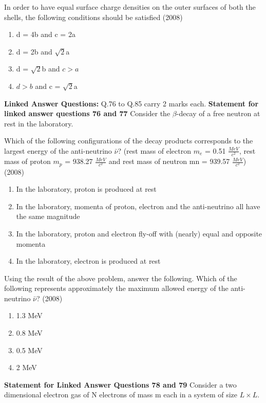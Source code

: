     \item In order to have equal surface charge densities on the outer surfaces of both the shells, the following conditions should be satisfied \hfill (2008)
     \begin{enumerate}[label=(\Alph*)]
        \item d = 4b and c = 2a
        \item d = 2b and $\sqrt{2}$a
        \item d = $\sqrt{2}$b and $c>a$
        \item $d>b$ and c = $\sqrt{2}$a 
     \end{enumerate}
    \textbf{Linked Answer Questions:} Q.76 to Q.85 carry 2 marks each.
    \textbf{Statement for linked answer questions 76 and 77}
    Consider the $\beta$-decay of a free neutron at rest in the laboratory.
    \item Which of the following configurations of the decay products corresponds to the largest energy of the anti-neutrino $\bar{\nu}$? (rest mass of electron $m_e$ = 0.51 $\frac{MeV}{c^2}$, rest mass of proton $m_p$ = 938.27 $\frac{MeV}{c^2}$ and rest mass of neutron mn = 939.57 $\frac{MeV}{c^2}$) \hfill (2008)
      \begin{enumerate}[label=(\Alph*)]
        \item In the laboratory, proton is produced at rest
        \item In the laboratory, momenta of proton, electron and the anti-neutrino all have the same magnitude
        \item In the laboratory, proton and electron fly-off with (nearly) equal and opposite momenta
        \item In the laboratory, electron is produced at rest
      \end{enumerate}
    \item Using the result of the above problem, answer the following. Which of the following represents approximately the maximum allowed energy of the anti-neutrino $\bar{\nu}$? \hfill (2008)
    \begin{enumerate}[label=(\Alph*)]
        \item 1.3 MeV
        \item 0.8 MeV
        \item 0.5 MeV
        \item 2 MeV
    \end{enumerate}
    \textbf{Statement for Linked Answer Questions 78 and 79 }
    Consider a two dimensional electron gas of N electrons of mass m each in a system of size $L\times L$.

